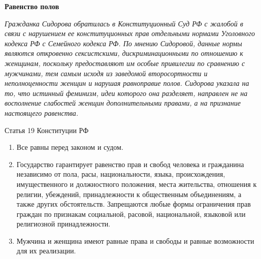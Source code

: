 \documentclass[a4paper, 12pt]{article}
\begin{document}
\newpage
\begin{center}\bf
Равенство полов 
\end{center}

\textit{Гражданка Сидорова обратилась в Конституционный Суд РФ с жалобой в связи с нарушением ее конституционных прав отдельными нормами Уголовного кодекса РФ с Семейного кодекса РФ. По мнению Сидоровой, данные нормы являются откровенно сексистскими, дискриминационными по отношению к женщинам, поскольку предоставляют им особые привилегии по сравнению с мужчинами, тем самым исходя из заведомой второсортности и неполноценности женщин и нарушая равноправие полов. Сидорова указала на то, что истинный феминизм, идеи которого она разделяет, направлен не на восполнение слабостей женщин дополнительными правами, а на признание настоящего равенства.}

Статья 19 Конституции РФ
\begin{enumerate}
\item  Все равны перед законом и судом. 
\item  Государство гарантирует равенство прав и свобод человека и гражданина независимо от пола, расы, национальности, языка, происхождения, имущественного и должностного положения, места жительства, отношения к религии, убеждений, принадлежности к общественным объединениям, а также других обстоятельств. Запрещаются любые формы ограничения прав граждан по признакам социальной, расовой, национальной, языковой или религиозной принадлежности. 
\item  Мужчина и женщина имеют равные права и свободы и равные возможности для их реализации. 
\end{enumerate}
\end{document}
